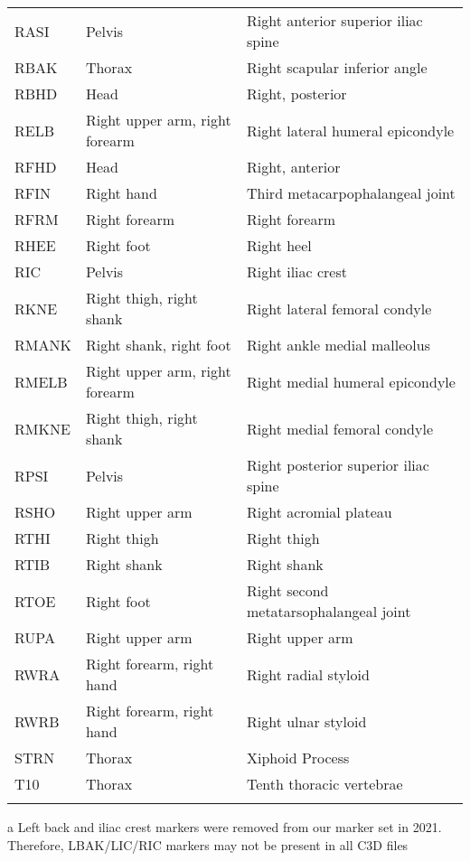 \documentclass[
]{article}
\begin{document}
\begin{table}[h]
\begin{threeparttable}
\begin{tabular}{C{0.25\textwidth}C{0.375\textwidth}R{0.375\textwidth}}
RASI & Pelvis & Right anterior superior iliac spine \\
RBAK & Thorax & Right scapular inferior angle \\
RBHD & Head & Right, posterior \\
RELB & Right upper arm, right forearm & Right lateral humeral epicondyle \\
RFHD & Head & Right, anterior \\
RFIN & Right hand & Third metacarpophalangeal joint \\
RFRM & Right forearm & Right forearm \\
RHEE & Right foot & Right heel \\
RIC & Pelvis & Right iliac crest \\
RKNE & Right thigh, right shank & Right lateral femoral condyle \\
RMANK & Right shank, right foot & Right ankle medial malleolus \\
RMELB & Right upper arm, right forearm & Right medial humeral epicondyle \\
RMKNE & Right thigh, right shank & Right medial femoral condyle\\
RPSI & Pelvis & Right posterior superior iliac spine \\
RSHO & Right upper arm & Right acromial plateau \\
RTHI & Right thigh & Right thigh \\
RTIB & Right shank & Right shank \\
RTOE & Right foot & Right second metatarsophalangeal joint \\
RUPA & Right upper arm & Right upper arm \\
RWRA & Right forearm, right hand & Right radial styloid \\
RWRB & Right forearm, right hand & Right ulnar styloid \\
STRN & Thorax & Xiphoid Process \\
T10 & Thorax & Tenth thoracic vertebrae \\
\hhline{===}
\end{tabular}
\begin{tablenotes}[flushleft]
\scriptsize{
\item[a] Left back and iliac crest markers were removed from our marker set in 2021. Therefore, LBAK/LIC/RIC markers may not be present in all C3D files
}
\end{tablenotes}
\end{threeparttable}
\label{tbl:markerset}
\end{table}
\end{document}
